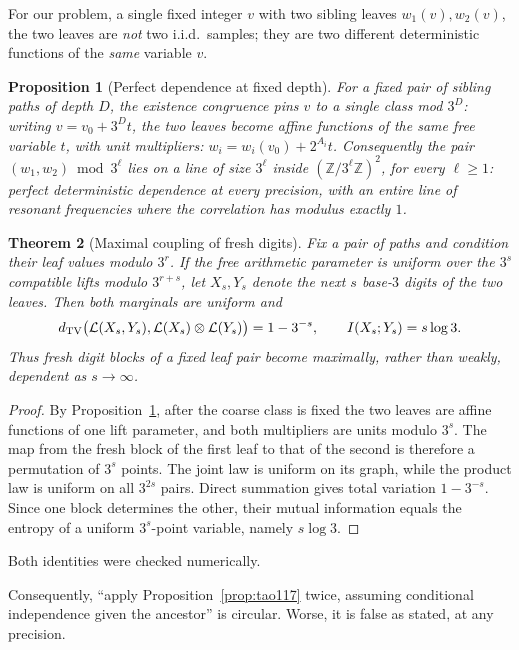 \documentclass[11pt]{article}
\newtheorem{theorem}{Theorem}[section]
\newtheorem{proposition}[theorem]{Proposition}
\theoremstyle{definition}
\theoremstyle{remark}
\begin{document}
For our problem, a single fixed integer $v$ with two sibling leaves
$w_1(v),w_2(v)$, the two leaves are \emph{not} two i.i.d.\ samples;
they are two different deterministic functions of the \emph{same}
variable $v$.

\begin{proposition}[Perfect dependence at fixed depth]\label{prop:fixed-pair}
For a fixed pair of sibling paths of depth $D$, the existence
congruence pins $v$ to a single class mod $3^D$: writing
$v=v_0+3^D t$, the two leaves become affine functions of the same free
variable $t$, with unit multipliers: $w_i=w_i(v_0)+2^{A_i}t$.
Consequently the pair $(w_1,w_2)\bmod 3^\ell$ lies on a line of size
$3^\ell$ inside $(\mathbb{Z}/3^\ell\mathbb{Z})^2$, for every $\ell\ge 1$:
perfect deterministic dependence at every precision, with an entire
line of resonant frequencies where the correlation has modulus exactly
$1$.
\end{proposition}

\begin{theorem}[Maximal coupling of fresh digits]
\label{thm:fresh-digit-coupling}
Fix a pair of paths and condition their leaf values modulo $3^r$.
If the free arithmetic parameter is uniform over the $3^s$ compatible
lifts modulo $3^{r+s}$, let $X_s,Y_s$ denote the next $s$ base-$3$
digits of the two leaves. Then both marginals are uniform and
\[
 d_{\rm TV}\bigl(\mathcal L(X_s,Y_s),
     \mathcal L(X_s)\otimes\mathcal L(Y_s)\bigr)=1-3^{-s},
 \qquad
 I(X_s;Y_s)=s\log3.
\]
Thus fresh digit blocks of a fixed leaf pair become maximally, rather
than weakly, dependent as $s\to\infty$.
\end{theorem}

\begin{proof}
By Proposition~\ref{prop:fixed-pair}, after the coarse class is fixed
the two leaves are affine functions of one lift parameter, and both
multipliers are units modulo $3^s$. The map from the fresh block of the
first leaf to that of the second is therefore a permutation of
$3^s$ points. The joint law is uniform on its graph, while the product
law is uniform on all $3^{2s}$ pairs. Direct summation gives total
variation $1-3^{-s}$. Since one block determines the other, their
mutual information equals the entropy of a uniform $3^s$-point
variable, namely $s\log3$.
\end{proof}

Both identities were checked numerically.

Consequently, ``apply Proposition~\ref{prop:tao117} twice, assuming
conditional independence given the ancestor'' is circular. Worse, it
is false as stated, at any precision.
\end{document}
